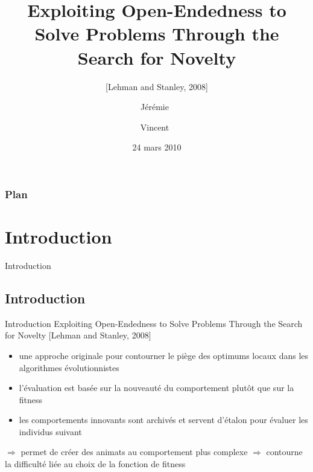 \documentclass{beamer}
\title{Exploiting Open-Endedness to Solve Problems Through the Search for Novelty}
\subtitle{[Lehman and Stanley, 2008]}
\author{Jérémie~\bsc{Decock} \and Vincent~\bsc{Renaudineau}}
\institute{UPMC}
\date{24 mars 2010}
\begin{document}
\begin{frame}
\titlepage
\end{frame}


\begin{frame}
\frametitle{Plan}
\tableofcontents[sectionstyle=show/show,subsectionstyle=hide/hide/hide]
\end{frame}


\section{Introduction}
\begin{frame}
\begin{center}
{\LARGE Introduction}
\end{center}
\end{frame}

\subsection{Introduction}

\begin{frame}{Introduction}
    Exploiting Open-Endedness to Solve Problems Through the Search for Novelty [Lehman and Stanley, 2008]
    \begin{itemize}
         \item une approche originale pour contourner le piège des optimums locaux dans les algorithmes évolutionnistes
         \item l'évaluation est basée sur la \og{}nouveauté\fg{} du comportement plut\^{o}t que sur la fitness
         \item les comportements innovants sont archivés et servent d'étalon pour évaluer les individus suivant
    \end{itemize}
    \bigskip
	$\Rightarrow$ permet de créer des animats au comportement plus complexe
	$\Rightarrow$ contourne la difficulté liée au choix de la fonction de fitness
\end{frame}
\end{document}
